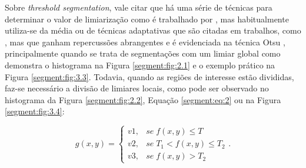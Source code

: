 Sobre \textit{threshold segmentation}, vale citar que há uma série de técnicas para determinar o valor de limiarização como é trabalhado por \cite{Atta2018ImageTechniques}, mas habitualmente utiliza-se da média \citep{Atta2018ImageTechniques, Yanowitz1989, Yuheng2017} ou de técnicas adaptativas que são citadas em trabalhos, como \cite{Yanowitz1989}, mas que ganham repercussões abrangentes e é evidenciada na técnica Otsu \citep{Otsu1979}, principalmente quando se trata de segmentações com um limiar global como demonstra o histograma na Figura \ref{segment:fig:2.1} e o exemplo prático na Figura  \ref{segment:fig:3.3}. Todavia, quando as regiões de interesse estão divididas, faz-se necessário a divisão de limiares locais, como pode ser observado no histograma da Figura \ref{segment:fig:2.2}, Equação \ref{segment:eq:2} ou na Figura \ref{segment:fig:3.4}:

\begin{equation}
\label{segment:eq:2}
    g(x,y) = \begin{cases}
        v1, & se \; f(x,y) \leq T \\ 
        v2, & se \; T_1 < f(x,y) \leq T_2 \\
        v3, & se \; f(x,y) > T_2
    \end{cases}.
\end{equation}

